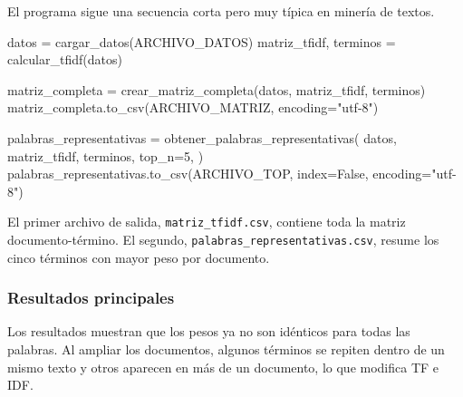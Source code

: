 \documentclass[
  spanish,
  letterpaper,
  DIV=11,
  numbers=noendperiod]{scrartcl}
\newenvironment{Shaded}{\begin{snugshade}}{\end{snugshade}}
\newcommand{\DecValTok}[1]{\textcolor[rgb]{0.68,0.00,0.00}{#1}}
\newcommand{\NormalTok}[1]{\textcolor[rgb]{0.00,0.23,0.31}{#1}}
\newcommand{\OperatorTok}[1]{\textcolor[rgb]{0.37,0.37,0.37}{#1}}
\newcommand{\StringTok}[1]{\textcolor[rgb]{0.13,0.47,0.30}{#1}}
\newcommand{\VariableTok}[1]{\textcolor[rgb]{0.07,0.07,0.07}{#1}}
\begin{document}
El programa sigue una secuencia corta pero muy típica en minería de
textos.

\begin{Shaded}
\begin{Highlighting}[]
\NormalTok{datos }\OperatorTok{=}\NormalTok{ cargar\_datos(ARCHIVO\_DATOS)}
\NormalTok{matriz\_tfidf, terminos }\OperatorTok{=}\NormalTok{ calcular\_tfidf(datos)}

\NormalTok{matriz\_completa }\OperatorTok{=}\NormalTok{ crear\_matriz\_completa(datos, matriz\_tfidf, terminos)}
\NormalTok{matriz\_completa.to\_csv(ARCHIVO\_MATRIZ, encoding}\OperatorTok{=}\StringTok{"utf{-}8"}\NormalTok{)}

\NormalTok{palabras\_representativas }\OperatorTok{=}\NormalTok{ obtener\_palabras\_representativas(}
\NormalTok{    datos,}
\NormalTok{    matriz\_tfidf,}
\NormalTok{    terminos,}
\NormalTok{    top\_n}\OperatorTok{=}\DecValTok{5}\NormalTok{,}
\NormalTok{)}
\NormalTok{palabras\_representativas.to\_csv(ARCHIVO\_TOP, index}\OperatorTok{=}\VariableTok{False}\NormalTok{, encoding}\OperatorTok{=}\StringTok{"utf{-}8"}\NormalTok{)}
\end{Highlighting}
\end{Shaded}

El primer archivo de salida, \texttt{matriz\_tfidf.csv}, contiene toda
la matriz documento-término. El segundo,
\texttt{palabras\_representativas.csv}, resume los cinco términos con
mayor peso por documento.

\subsubsection{Resultados principales}\label{resultados-principales}

Los resultados muestran que los pesos ya no son idénticos para todas las
palabras. Al ampliar los documentos, algunos términos se repiten dentro
de un mismo texto y otros aparecen en más de un documento, lo que
modifica TF e IDF.
\end{document}
